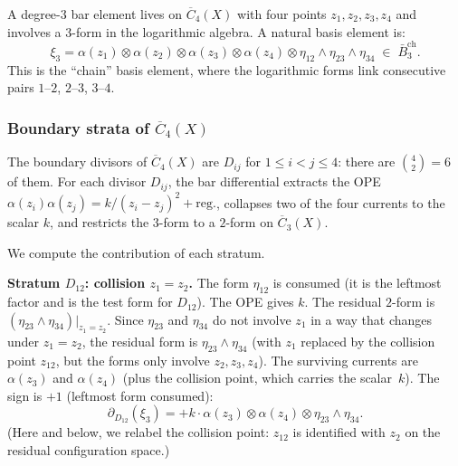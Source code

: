 A degree-$3$ bar element lives on $\overline{C}_4(X)$ with four
points $z_1, z_2, z_3, z_4$ and involves a $3$-form in the
logarithmic algebra.  A natural basis element is:
\begin{equation}\label{eq:frame-bar3-element}
\xi_3 = \alpha(z_1) \otimes \alpha(z_2) \otimes \alpha(z_3)
  \otimes \alpha(z_4)
  \otimes \eta_{12} \wedge \eta_{23} \wedge \eta_{34}
  \;\in\; \bar{B}^{\mathrm{ch}}_3.
\end{equation}
This is the ``chain'' basis element, where the logarithmic forms
link consecutive pairs $1$--$2$, $2$--$3$, $3$--$4$.

\subsubsection*{Boundary strata of $\overline{C}_4(X)$}

The boundary divisors of $\overline{C}_4(X)$ are $D_{ij}$ for
$1 \leq i < j \leq 4$: there are $\binom{4}{2} = 6$ of them.
For each divisor $D_{ij}$, the bar differential extracts the
OPE $\alpha(z_i)\alpha(z_j) = k/(z_i - z_j)^2 + \mathrm{reg.}$,
collapses two of the four currents to the scalar $k$, and restricts
the $3$-form to a $2$-form on $\overline{C}_3(X)$.

We compute the contribution of each stratum.

\medskip
\noindent\textbf{Stratum $D_{12}$: collision $z_1 = z_2$.}
The form $\eta_{12}$ is consumed (it is the leftmost factor and
is the test form for $D_{12}$).  The OPE gives $k$.  The residual
$2$-form is $(\eta_{23} \wedge \eta_{34})|_{z_1 = z_2}$.  Since
$\eta_{23}$ and $\eta_{34}$ do not involve $z_1$ in a way that
changes under $z_1 = z_2$, the residual form is
$\eta_{23} \wedge \eta_{34}$ (with $z_1$ replaced by the
collision point $z_{12}$, but the forms only involve $z_2, z_3, z_4$).
The surviving currents are $\alpha(z_3)$ and $\alpha(z_4)$
(plus the collision point, which carries the scalar~$k$).
The sign is $+1$ (leftmost form consumed):
\begin{equation}\label{eq:frame-D12-deg3}
\partial_{D_{12}}(\xi_3)
= +k \cdot \alpha(z_3) \otimes \alpha(z_4)
  \otimes \eta_{23} \wedge \eta_{34}.
\end{equation}
(Here and below, we relabel the collision point: $z_{12}$ is
identified with $z_2$ on the residual configuration space.)


